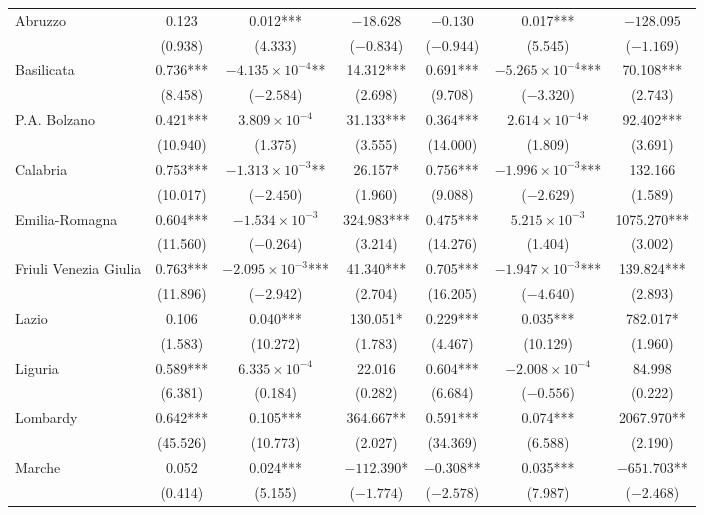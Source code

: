 \documentclass[12pt]{article}
\begin{document}
\begin{longtable}{@{}lcccccc@{}}
        Abruzzo & 0.123 & 0.012*** & $-18.628$ & $-0.130$ & 0.017*** & $-128.095$ \\ 
         & (0.938) & (4.333) & ($-0.834$) & ($-0.944$) & (5.545) & ($-1.169$) \\ 
        Basilicata & 0.736*** & $-4.135 \times 10^{-4}$** & 14.312*** & 0.691*** & $-5.265 \times 10^{-4}$*** & 70.108*** \\ 
         & (8.458) & ($-2.584$) & (2.698) & (9.708) & ($-3.320$) & (2.743) \\ 
        P.A. Bolzano & 0.421*** & $3.809 \times 10^{-4}$ & 31.133*** & 0.364*** & $2.614 \times 10^{-4}$* & 92.402*** \\ 
         & (10.940) & (1.375) & (3.555) & (14.000) & (1.809) & (3.691) \\ 
        Calabria & 0.753*** & $-1.313 \times 10^{-3}$** & 26.157* & 0.756*** & $-1.996 \times 10^{-3}$*** & 132.166 \\ 
         & (10.017) & ($-2.450$) & (1.960) & (9.088) & ($-2.629$) & (1.589) \\ 
        Emilia-Romagna & 0.604*** & $-1.534 \times 10^{-3}$ & 324.983*** & 0.475*** & $5.215 \times 10^{-3}$ & 1075.270*** \\ 
         & (11.560) & ($-0.264$) & (3.214) & (14.276) & (1.404) & (3.002) \\ 
        Friuli Venezia Giulia & 0.763*** & $-2.095 \times 10^{-3}$*** & 41.340*** & 0.705*** & $-1.947 \times 10^{-3}$*** & 139.824*** \\ 
         & (11.896) & ($-2.942$) & (2.704) & (16.205) & ($-4.640$) & (2.893) \\ 
        Lazio & 0.106 & 0.040*** & 130.051* & 0.229*** & 0.035*** & 782.017* \\ 
         & (1.583) & (10.272) & (1.783) & (4.467) & (10.129) & (1.960) \\ 
        Liguria & 0.589*** & $6.335 \times 10^{-4}$ & 22.016 & 0.604*** & $-2.008 \times 10^{-4}$ & 84.998 \\ 
         & (6.381) & (0.184) & (0.282) & (6.684) & ($-0.556$) & (0.222) \\ 
        Lombardy & 0.642*** & 0.105*** & 364.667** & 0.591*** & 0.074*** & 2067.970** \\ 
         & (45.526) & (10.773) & (2.027) & (34.369) & (6.588) & (2.190) \\ 
        Marche & 0.052 & 0.024*** & $-112.390$* & $-0.308$** & 0.035*** & $-651.703$** \\ 
         & (0.414) & (5.155) & ($-1.774$) & ($-2.578$) & (7.987) & ($-2.468$) \\ 

\end{longtable}
\end{document}
